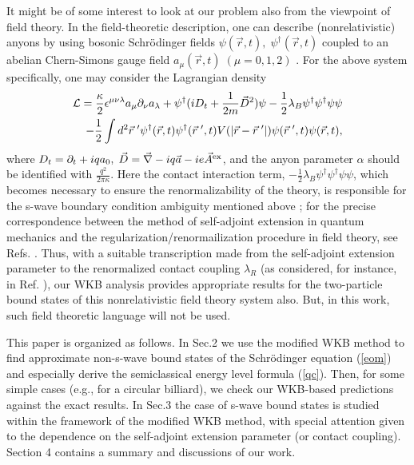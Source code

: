 \documentclass[a4paper,aps,eqsecnum,preprint,preprintnumbers,12pt]{revtex4}
\begin{document}
It might be of some interest to look at our problem also from the
viewpoint of field theory. In the field-theoretic description, one
can describe (nonrelativistic) anyons by using bosonic
Schr\"{o}dinger fields $\psi(\vec{r},t), \;
\psi^{\dag}(\vec{r},t)$ coupled to an abelian Chern-Simons gauge
field $a_{\mu}(\vec{r} ,t) \; (\mu = 0, 1, 2)$ \cite{hagen}. For
the above system specifically, one may consider the Lagrangian
density
\begin{eqnarray} \label{ld}
{\cal L} = \frac{\kappa}{2} \epsilon^{\mu\nu\lambda} a_{\mu}
\partial_{\nu} a_{\lambda} + \psi^{\dag} (i D_{t} + \frac{1}{2m}
\vec{D}^{2}) \psi - \frac{1}{2} \lambda_{B}
\psi^{\dag} \psi^{\dag} \psi \psi \nonumber \\
- \frac{1}{2} \int d^{2}\vec{r}\;' \psi^{\dag}(\vec{r},t)
\psi^{\dag}(\vec{r}\;',t) V(|\vec{r}-\vec{r}\;'|)
\psi(\vec{r}\;',t) \psi(\vec{r},t),
\end{eqnarray}
where $D_{t} = \partial_{t} + i q a_{0}, \; \vec{D} = \vec{\nabla}
- i q \vec{a} - i e \vec{A}^{\rm ex}$, and the anyon parameter
$\alpha$ should be identified with $\displaystyle
\frac{q^{2}}{2\pi \kappa}$. Here the contact interaction term,
$\displaystyle -\frac{1}{2} \lambda_{B} \psi^{\dag} \psi^{\dag}
\psi \psi$, which becomes necessary to ensure the
renormalizability of the theory, is responsible for the s-wave
boundary condition ambiguity mentioned above \cite{bergman}; for
the precise correspondence between the method of self-adjoint
extension in quantum mechanics and the
regularization/renormailization procedure in field theory, see
Refs. \cite{bergman, kim, kim2}. Thus, with a suitable
transcription made from the self-adjoint extension parameter to
the renormalized contact coupling $\lambda_{R}$ (as considered,
for instance, in Ref. \cite{kim2}), our WKB analysis provides
appropriate results for the two-particle bound states of this
nonrelativistic field theory system also. But, in this work, such
field theoretic language will not be used.

This paper is organized as follows. In Sec.2 we use the modified
WKB method to find approximate non-s-wave bound states of the
Schr\"{o}dinger equation (\ref{eom}) and especially derive the
semiclassical energy level formula (\ref{qc}). Then, for some
simple cases (e.g., for a circular billiard), we check our
WKB-based predictions against the exact results. In Sec.3 the case
of s-wave bound states is studied within the framework of the
modified WKB method, with special attention given to the
dependence on the self-adjoint extension parameter (or contact
coupling). Section 4 contains a summary and discussions of our
work.
\end{document}
